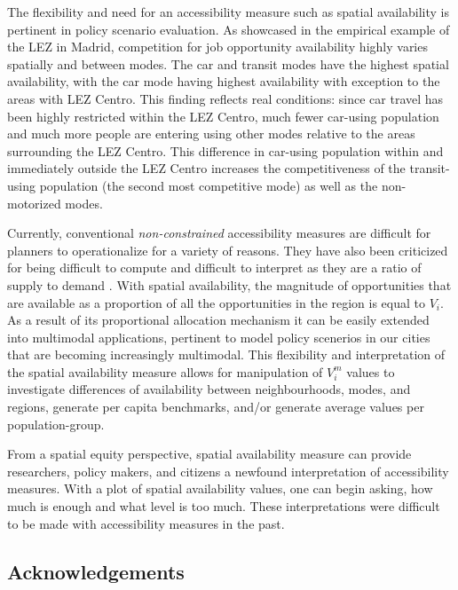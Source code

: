 \documentclass[]{trbunofficial}
\begin{document}
The flexibility and need for an accessibility measure such as spatial
availability is pertinent in policy scenario evaluation. As showcased in
the empirical example of the LEZ in Madrid, competition for job
opportunity availability highly varies spatially and between modes. The
car and transit modes have the highest spatial availability, with the
car mode having highest availability with exception to the areas with
LEZ Centro. This finding reflects real conditions: since car travel has
been highly restricted within the LEZ Centro, much fewer car-using
population and much more people are entering using other modes relative
to the areas surrounding the LEZ Centro. This difference in car-using
population within and immediately outside the LEZ Centro increases the
competitiveness of the transit-using population (the second most
competitive mode) as well as the non-motorized modes.

Currently, conventional \emph{non-constrained} accessibility measures
are difficult for planners to operationalize for a variety of reasons.
They have also been criticized for being difficult to compute and
difficult to interpret as they are a ratio of supply to demand
\citep{levinsonTransportAccessManual2020}. With spatial availability,
the magnitude of opportunities that are available as a proportion of all
the opportunities in the region is equal to \(V_i\). As a result of its
proportional allocation mechanism it can be easily extended into
multimodal applications, pertinent to model policy scenerios in our
cities that are becoming increasingly multimodal. This flexibility and
interpretation of the spatial availability measure allows for
manipulation of \(V_i^m\) values to investigate differences of
availability between neighbourhoods, modes, and regions, generate per
capita benchmarks, and/or generate average values per population-group.

From a spatial equity perspective, spatial availability measure can
provide researchers, policy makers, and citizens a newfound
interpretation of accessibility measures. With a plot of spatial
availability values, one can begin asking, how much is enough and what
level is too much. These interpretations were difficult to be made with
accessibility measures in the past.

\hypertarget{acknowledgements}{%
\subsection{Acknowledgements}\label{acknowledgements}}
\end{document}
